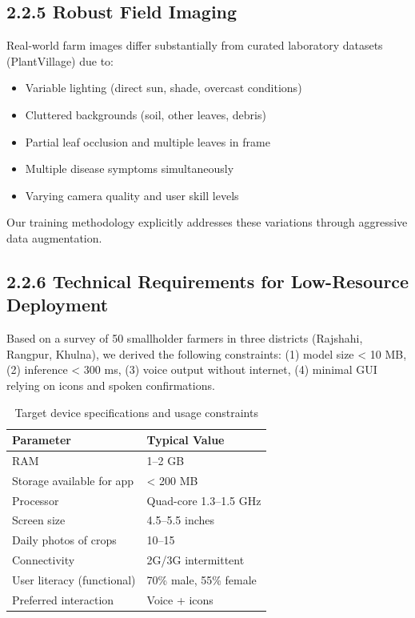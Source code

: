 \documentclass[12pt,letterpaper]{report}
\begin{document}
\subsection*{2.2.5 Robust Field Imaging}
Real-world farm images differ substantially from curated laboratory datasets (PlantVillage) due to:
\begin{itemize}
    \item Variable lighting (direct sun, shade, overcast conditions)
    \item Cluttered backgrounds (soil, other leaves, debris)
    \item Partial leaf occlusion and multiple leaves in frame
    \item Multiple disease symptoms simultaneously
    \item Varying camera quality and user skill levels
\end{itemize}
Our training methodology explicitly addresses these variations through aggressive data augmentation.


\subsection*{2.2.6 Technical Requirements for Low-Resource Deployment}
Based on a survey of 50 smallholder farmers in three districts (Rajshahi, Rangpur, Khulna), we derived the following constraints: (1) model size < 10 MB, (2) inference < 300 ms, (3) voice output without internet, (4) minimal GUI relying on icons and spoken confirmations.

\begin{table}[H]
\centering
\caption{Target device specifications and usage constraints}
\label{tab:target}
\begin{tabular}{@{}ll@{}}
\toprule
\textbf{Parameter} & \textbf{Typical Value} \\
\midrule
RAM & 1–2 GB \\
Storage available for app & < 200 MB \\
Processor & Quad-core 1.3–1.5 GHz \\
Screen size & 4.5–5.5 inches \\
Daily photos of crops & 10–15 \\
Connectivity & 2G/3G intermittent \\
User literacy (functional) & 70\% male, 55\% female \\
Preferred interaction & Voice + icons \\
\bottomrule
\end{tabular}
\end{table}
\end{document}
